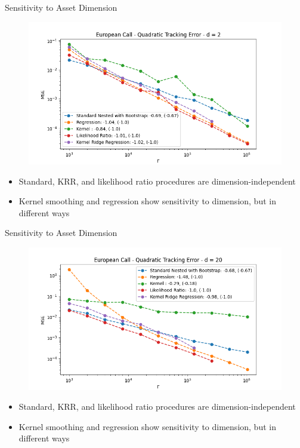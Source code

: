 \documentclass[9pt,handout]{beamer}
\begin{document}
\begin{frame}{Sensitivity to Asset Dimension}

\begin{figure}
    \includegraphics[width=\textwidth]{../project1/figures/figure2a.png}
\end{figure}

\begin{itemize}
    \item Standard, KRR, and likelihood ratio procedures are dimension-independent
    \item Kernel smoothing and regression show sensitivity to dimension, but in different ways
\end{itemize}

\end{frame}

\begin{frame}{Sensitivity to Asset Dimension}

    \begin{figure}
        \includegraphics[width=\textwidth]{../project1/figures/figure2b.png}
    \end{figure}
    
    \begin{itemize}
        \item Standard, KRR, and likelihood ratio procedures are dimension-independent
        \item Kernel smoothing and regression show sensitivity to dimension, but in different ways
    \end{itemize}
    
\end{frame}
\end{document}

